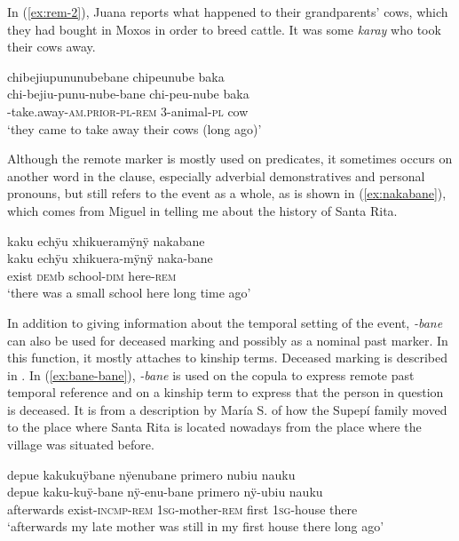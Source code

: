 In (\ref{ex:rem-2}), Juana reports what happened to their grandparents’ cows, which they had bought in Moxos in order to breed cattle. It was some \textit{karay} who took their cows away.

\ea\label{ex:rem-2}
\begingl
\glpreamble chibejiupununubebane chipeunube baka\\
\gla chi-bejiu-punu-nube-bane chi-peu-nube baka\\
-take.away-\textsc{am.prior}-\textsc{pl}-\textsc{rem} 3-animal-\textsc{pl} cow\\
\glft ‘they came to take away their cows (long ago)’
\endgl
\trailingcitation{[jxx-e150925l-1.226]}
\xe


Although the remote marker is mostly used on predicates, it sometimes occurs on another word in the clause, especially adverbial demonstratives and personal pronouns, but still refers to the event as a whole, as is shown in (\ref{ex:nakabane}), which comes from Miguel in telling me about the history of Santa Rita.

\ea\label{ex:nakabane}
\begingl 
\glpreamble kaku echÿu xhikueramÿnÿ nakabane\\
\gla kaku echÿu xhikuera-mÿnÿ naka-bane\\ 
\glb exist \textsc{dem}b school-\textsc{dim} here-\textsc{rem}\\ 
\glft ‘there was a small school here long time ago’
\trailingcitation{[mxx-p110825l.084]}
\xe

In addition to giving information about the temporal setting of the event, \textit{-bane} can also be used for deceased marking and possibly as a nominal past marker. In this function, it mostly attaches to kinship terms. Deceased marking is described in . In (\ref{ex:bane-bane}), \textit{-bane} is used on the copula to express remote past temporal reference and on a kinship term to express that the person in question is deceased. It is from a description by María S. of how the Supepí family moved to the place where Santa Rita is located nowadays from the place where the village was situated before. %

\ea\label{ex:bane-bane}
\begingl 
\glpreamble depue kakukuÿbane nÿenubane primero nubiu nauku\\
\gla depue kaku-kuÿ-bane nÿ-enu-bane primero nÿ-ubiu nauku\\ 
\glb afterwards exist-\textsc{incmp}-\textsc{rem} 1\textsc{sg}-mother-\textsc{rem} first 1\textsc{sg}-house there\\ 
\glft ‘afterwards my late mother was still in my first house there long ago’
\trailingcitation{[rxx-e120511l.172]}%
\xe

